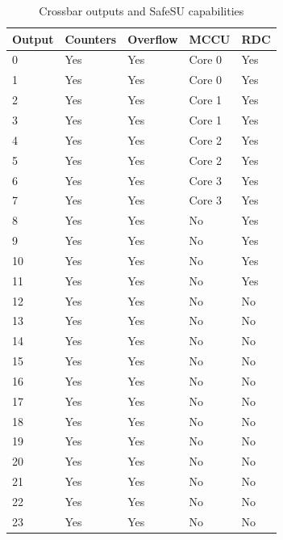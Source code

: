 \begin{table}
	\caption{Crossbar outputs and SafeSU capabilities}
	\label{tab:features}
\begin{small}
	\begin{center} 
		\begin{tabular}{|l|l|l|l|l|}
			\hline
			\textbf{Output} & \textbf{Counters} & \textbf{Overflow}  & \textbf{MCCU}  & \textbf{RDC}\\
			\hline
			0 & Yes & Yes & Core 0 & Yes \\
			\hline
			1 & Yes & Yes & Core 0 & Yes \\
			\hline
			2 & Yes & Yes & Core 1 & Yes \\
			\hline
			3 & Yes & Yes & Core 1 & Yes \\
			\hline
			4 & Yes & Yes & Core 2 & Yes \\
			\hline
			5 & Yes & Yes & Core 2 & Yes \\
			\hline
			6 & Yes & Yes & Core 3 & Yes \\
			\hline
			7 & Yes & Yes & Core 3 & Yes \\
			\hline
			8 & Yes & Yes & No & Yes \\
			\hline
			9 & Yes & Yes & No & Yes \\
			\hline
			10 & Yes & Yes & No & Yes \\
			\hline
			11 & Yes & Yes & No & Yes\\
			\hline
			12 & Yes & Yes & No & No \\
			\hline
			13 & Yes & Yes & No & No \\
			\hline
			14 & Yes & Yes & No & No \\
			\hline
			15 & Yes & Yes & No & No \\
			\hline
			16 & Yes & Yes & No & No \\
			\hline
			17 & Yes & Yes & No & No \\
			\hline
			18 & Yes & Yes & No & No \\
			\hline
			19 & Yes & Yes & No & No \\
			\hline
			20 & Yes & Yes & No & No \\
			\hline
			21 & Yes & Yes & No & No \\
			\hline
			22 & Yes & Yes & No & No \\
			\hline
			23 & Yes & Yes & No & No \\
			\hline
		\end{tabular}
	\end{center}
\end{small}
\end{table}


